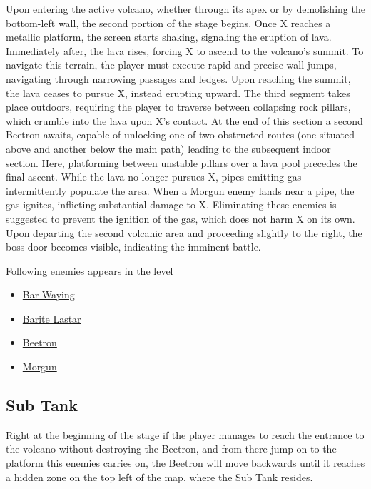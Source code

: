 Upon entering the active volcano, whether through its apex or by demolishing the bottom-left wall, the second portion of the stage begins. Once X reaches a metallic platform, the screen starts shaking, signaling the eruption of lava. Immediately after, the lava rises, forcing X to ascend to the volcano's summit. To navigate this terrain, the player must execute rapid and precise wall jumps, navigating through narrowing passages and ledges. Upon reaching the summit, the lava ceases to pursue X, instead erupting upward. The third segment takes place outdoors, requiring the player to traverse between collapsing rock pillars, which crumble into the lava upon X's contact. At the end of this section a second Beetron awaits, capable of unlocking one of two obstructed routes (one situated above and another below the main path) leading to the subsequent indoor section. Here, platforming between unstable pillars over a lava pool precedes the final ascent. While the lava no longer pursues X, pipes emitting gas intermittently populate the area. When a \hyperlink{enem:Morgun}{Morgun} enemy lands near a pipe, the gas ignites, inflicting substantial damage to X. Eliminating these enemies is suggested to prevent the ignition of the gas, which does not harm X on its own.
Upon departing the second volcanic area and proceeding slightly to the right, the boss door becomes visible, indicating the imminent battle.

Following enemies appears in the level~\cite{wiki:Volcanic_zone}
\begin{itemize}
	\item \hyperlink{enem:Bar_Waying}{Bar Waying}
	\item \hyperlink{enem:Barite_Lastar}{Barite Lastar}
	\item \hyperlink{enem:Beetron}{Beetron}
	\item \hyperlink{enem:Morgun}{Morgun}
\end{itemize}


\subsection{Sub Tank}
Right at the beginning of the stage if the player manages to reach the entrance to the volcano without destroying the Beetron, and from there jump on to the platform this enemies carries on, the Beetron will move backwards until it reaches a hidden zone on the top left of the map, where the Sub Tank resides. 


